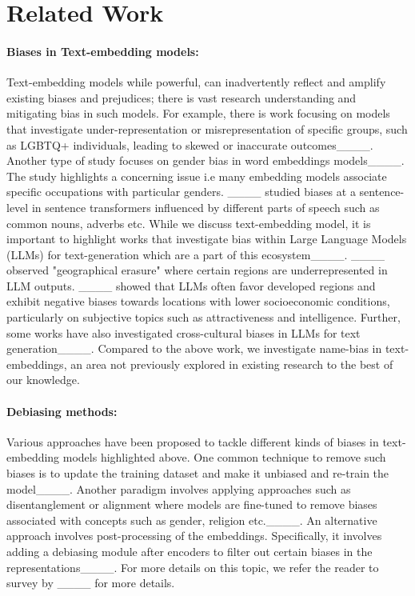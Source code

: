 \section{Related Work}
\vspace{-0.1in}
\label{sec:related}
\paragraph{Biases in Text-embedding models:} Text-embedding models while powerful, can inadvertently reflect and amplify existing biases and prejudices; there is vast research understanding and mitigating bias in such models. For example, there is work focusing on models that investigate under-representation or misrepresentation of  specific groups, such as LGBTQ+ individuals, leading to skewed or inaccurate outcomes____. Another type of study focuses on gender bias in word embeddings models____.  The study highlights a concerning issue i.e many embedding models associate specific occupations with particular genders. ____ studied biases at a sentence-level in sentence transformers influenced by different parts of speech such as common nouns, adverbs etc.
While we discuss text-embedding model, it is important to highlight works that investigate bias within Large Language Models (LLMs) for text-generation which are a part of this ecosystem____. ____ observed "geographical erasure" where certain regions are underrepresented in LLM outputs. ____  showed that LLMs often favor developed regions and exhibit negative biases towards locations with lower socioeconomic conditions, particularly on subjective topics such as attractiveness and intelligence. Further, some works have also investigated  cross-cultural biases in LLMs for text generation____. Compared to the above work, we investigate name-bias in text-embeddings, an area not previously explored in existing research to the best of our knowledge. 



\paragraph{Debiasing methods:} Various approaches have been proposed to tackle different kinds of biases in text-embedding models highlighted above. One common technique to remove such biases is to update the training dataset and make it unbiased and re-train the model____. Another paradigm involves applying approaches such as disentanglement or alignment where models are fine-tuned to remove biases associated with concepts such as gender, religion etc.____. 
An alternative approach involves post-processing of the embeddings. Specifically, it involves adding a debiasing module after encoders to filter out certain biases in the representations____. For more details on this topic, we refer the reader to survey by ____ for more details.

